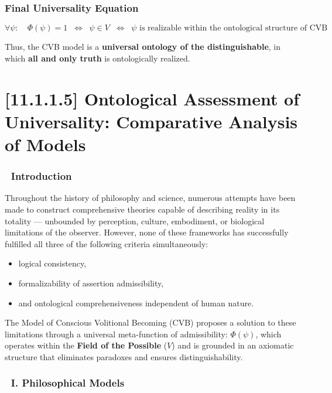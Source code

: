 \documentclass[12pt]{article}
\begin{document}
\subsubsection*{Final Universality Equation}

\[
\forall \psi:\quad \Phi(\psi) = 1 \;\;\Longleftrightarrow\;\; \psi \in V \;\;\Longleftrightarrow\;\; \psi \text{ is realizable within the ontological structure of CVB}
\]

Thus, the CVB model is a \textbf{universal ontology of the distinguishable}, in which \textbf{all and only truth} is ontologically realized.

\section*{[11.1.1.5] Ontological Assessment of Universality: Comparative Analysis of Models}

\subsubsection*{🔹 Introduction}

Throughout the history of philosophy and science, numerous attempts have been made to construct comprehensive theories capable of describing reality in its totality — unbounded by perception, culture, embodiment, or biological limitations of the observer. However, none of these frameworks has successfully fulfilled all three of the following criteria simultaneously:

\begin{itemize}
\item logical consistency,
\item formalizability of assertion admissibility,
\item and ontological comprehensiveness independent of human nature.
\end{itemize}

The Model of Conscious Volitional Becoming (CVB) proposes a solution to these limitations through a universal meta-function of admissibility: $\Phi(\psi)$, which operates within the \textbf{Field of the Possible} ($V$) and is grounded in an axiomatic structure that eliminates paradoxes and ensures distinguishability.

\subsubsection*{🔹 I. Philosophical Models}
\end{document}
